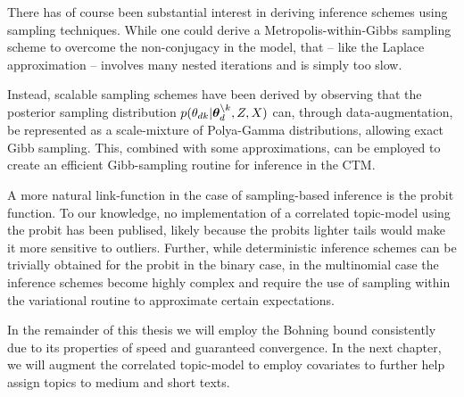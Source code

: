 There has of course been substantial interest in deriving inference schemes using sampling techniques. While one could derive a Metropolis-within-Gibbs sampling scheme to overcome the non-conjugacy in the model, that -- like the Laplace approximation -- involves many nested iterations and is simply too slow.

Instead, scalable sampling schemes have been derived by observing that the posterior sampling distribution $p({ \theta_{dk} }|\bm \theta_d^{\setminus k}, Z, X)$ can, through data-augmentation, be represented as a scale-mixture of Polya-Gamma distributions, allowing exact Gibb sampling. This, combined with some approximations, can be employed to create an efficient Gibb-sampling routine for inference in the CTM\cite{Chen2013}.

A more natural link-function in the case of sampling-based inference is the probit function. To our knowledge, no implementation of a correlated topic-model using the probit has been publised, likely because the probits lighter tails would make it more sensitive to outliers. Further, while deterministic inference schemes can be trivially obtained for the probit in the binary case\cite{AlbertChib1993}, in the multinomial case the inference schemes become highly complex and require the use of sampling within the variational routine to approximate certain expectations\cite{GiKa2003}.

In the remainder of this thesis we will employ the Bohning bound consistently due to its properties of speed and guaranteed convergence. In the next chapter, we will augment the correlated topic-model to employ covariates to further help assign topics to medium and short texts. 

